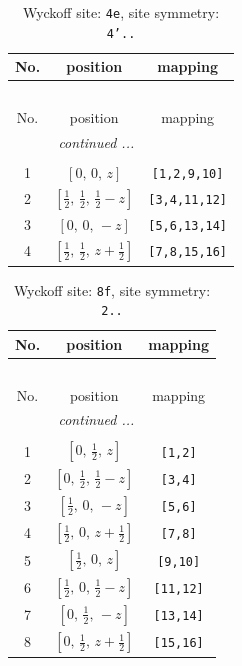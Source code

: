 \documentclass[fleqn,8pt]{jsarticle}
\begin{document}
\renewcommand{\arraystretch}{1.2}
\begin{longtable}{ccc}
\caption{Wyckoff site: {\tt 4e}, site symmetry: {\tt 4'..}}
 \\
 \hline \hline
No. & position & mapping \\ \hline \endfirsthead

\multicolumn{2}{l}{\tablename\ \thetable{}} \\
 \hline \hline
No. & position & mapping \\ \hline \endhead

 \hline \hline
\multicolumn{2}{r}{\footnotesize\it continued ...} \\ \endfoot

 \hline \hline
\multicolumn{2}{r}{} \\ \endlastfoot

1 & $\left[ 0,\, 0,\, z \right]$ & {\tt [1,2,9,10]} \\ \hline
2 & $\left[ \frac{1}{2},\, \frac{1}{2},\, \frac{1}{2} - z \right]$ & {\tt [3,4,11,12]} \\ \hline
3 & $\left[ 0,\, 0,\, - z \right]$ & {\tt [5,6,13,14]} \\ \hline
4 & $\left[ \frac{1}{2},\, \frac{1}{2},\, z + \frac{1}{2} \right]$ & {\tt [7,8,15,16]} \\
\end{longtable}
\renewcommand{\arraystretch}{1.2}
\begin{longtable}{ccc}
\caption{Wyckoff site: {\tt 8f}, site symmetry: {\tt 2..}}
 \\
 \hline \hline
No. & position & mapping \\ \hline \endfirsthead

\multicolumn{2}{l}{\tablename\ \thetable{}} \\
 \hline \hline
No. & position & mapping \\ \hline \endhead

 \hline \hline
\multicolumn{2}{r}{\footnotesize\it continued ...} \\ \endfoot

 \hline \hline
\multicolumn{2}{r}{} \\ \endlastfoot

1 & $\left[ 0,\, \frac{1}{2},\, z \right]$ & {\tt [1,2]} \\ \hline
2 & $\left[ 0,\, \frac{1}{2},\, \frac{1}{2} - z \right]$ & {\tt [3,4]} \\ \hline
3 & $\left[ \frac{1}{2},\, 0,\, - z \right]$ & {\tt [5,6]} \\ \hline
4 & $\left[ \frac{1}{2},\, 0,\, z + \frac{1}{2} \right]$ & {\tt [7,8]} \\ \hline
5 & $\left[ \frac{1}{2},\, 0,\, z \right]$ & {\tt [9,10]} \\ \hline
6 & $\left[ \frac{1}{2},\, 0,\, \frac{1}{2} - z \right]$ & {\tt [11,12]} \\ \hline
7 & $\left[ 0,\, \frac{1}{2},\, - z \right]$ & {\tt [13,14]} \\ \hline
8 & $\left[ 0,\, \frac{1}{2},\, z + \frac{1}{2} \right]$ & {\tt [15,16]} \\
\end{longtable}
\end{document}

